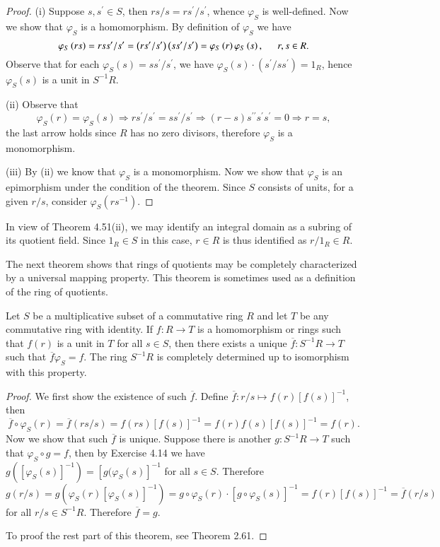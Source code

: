 \begin{proof}
(i) Suppose $s,s^\prime\in S$, then $rs/s=rs^\prime/s^\prime$, whence $\varphi_S$ is well-defined. Now we show that $\varphi_S$ is a homomorphism. By definition of $\varphi_S$ we have 
$$
\varphi _S\left( rs \right) =rss^{\prime}/s^{\prime}=\left( rs^{\prime}/s^{\prime} \right) \left( ss^{\prime}/s^{\prime} \right) =\varphi _S\left( r \right) \varphi _S\left( s \right) ,\hspace{0.5cm}r,s\in R.
$$
Observe that for each $\varphi_S(s)=ss^\prime/s^\prime$, we have $\varphi_S(s)\cdot(s^\prime/ss^\prime)=1_R$, hence $\varphi_S(s)$ is a unit in $S^{-1}R$.\par
(ii) Observe that 
$$
\varphi _S\left( r \right) =\varphi _S\left( s \right) \Rightarrow rs^{\prime}/s^{\prime}=ss^{\prime}/s^{\prime}\Rightarrow \left( r-s \right) s^{\prime\prime}s^{\prime}s^{\prime}=0\Rightarrow r=s,
$$
the last arrow holds since $R$ has no zero divisors, therefore $\varphi_S$ is a monomorphism.\par
(iii) By (ii) we know that $\varphi_S$ is a monomorphism. Now we show that $\varphi_S$ is an epimorphism under the condition of the theorem. Since $S$ consists of units, for a given $r/s$, consider $\varphi_S(rs^{-1})$.
\end{proof}
In view of Theorem 4.51(ii), we may identify an integral domain as a subring of its quotient field. Since $1_R\in S$ in this case, $r\in R$ is thus identified as $r/1_R\in R$.\par
The next theorem shows that rings of quotients may be completely characterized 
by a universal mapping property. This theorem is sometimes used as a definition of 
the ring of quotients.
\begin{theorem}
Let $S$ be a multiplicative subset of a commutative ring $R$ and let $T$ be any commutative ring with identity. If $f:R\to T$ is a homomorphism or rings such that $f(r)$ is a unit in $T$ for all $s\in S$, then there exists a unique $\overline{f}:S^{-1}R\to T$ such that $\overline{f}\varphi_S=f$. The ring $S^{-1}R$ is completely determined up to isomorphism with this property.
\end{theorem}
\begin{proof}
We first show the existence of such $\overline{f}$. Define $\overline{f}:r/s\mapsto f(r)[f(s)]^{-1}$, then 
$$
\overline{f}\circ \varphi _S\left( r \right) =\overline{f}\left( rs/s \right) =f\left( rs \right) \left[ f\left( s \right) \right] ^{-1}=f\left( r \right) f\left( s \right) \left[ f\left( s \right) \right] ^{-1}=f\left( r \right) .
$$
Now we show that such $\overline{f}$ is unique. Suppose there is another $g:S^{-1}R\to T$ such that $\varphi_S\circ g=f$, then by Exercise 4.14 we have $g([\varphi_S(s)]^{-1})=[g(\varphi_S(s)]^{-1}$ for all $s\in S$. Therefore 
$$
g\left( r/s \right) =g\left( \varphi _S\left( r \right) \left[ \varphi _S\left( s \right) \right] ^{-1} \right) =g\circ \varphi _S\left( r \right) \cdot \left[ g\circ \varphi _S\left( s \right) \right] ^{-1}=f\left( r \right) \left[ f\left( s \right) \right] ^{-1}=\overline{f}\left( r/s \right) 
$$
for all $r/s\in S^{-1}R$. Therefore $\overline{f}=g$.\par
To proof the rest part of this theorem, see Theorem 2.61.
\end{proof}
